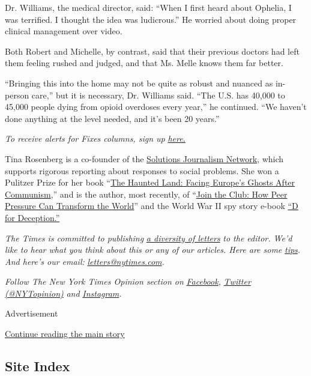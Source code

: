 Dr. Williams, the medical director, said: ``When I first heard about
Ophelia, I was terrified. I thought the idea was ludicrous.'' He worried
about doing proper clinical management over video.

Both Robert and Michelle, by contrast, said that their previous doctors
had left them feeling rushed and judged, and that Ms. Melle knows them
far better.

``Bringing this into the home may not be quite as robust and nuanced as
in-person care,'' but it is necessary, Dr. Williams said. ``The U.S. has
40,000 to 45,000 people dying from opioid overdoses every year,'' he
continued. ``We haven't done anything at the level needed, and it's been
20 years.''

\emph{To receive alerts for Fixes columns, sign up}
\href{http://eepurl.com/ABIxL}{\emph{here.}}

Tina Rosenberg is a co-founder of the
\href{http://solutionsjournalism.org}{Solutions Journalism Network},
which supports rigorous reporting about responses to social problems.
She won a Pulitzer Prize for her book
``\href{http://www.randomhouse.com/catalog/display.pperl?isbn=9780679744993}{The
Haunted Land: Facing Europe's Ghosts After Communism},'' and is the
author, most recently, of
``\href{http://books.wwnorton.com/books/Join-the-Club}{Join the Club:
How Peer Pressure Can Transform the World}'' and the World War II spy
story e-book
\href{https://www.goodreads.com/book/show/16124470-d-for-deception}{``D
for Deception.''}

\emph{The Times is committed to publishing}
\href{https://www.nytimes.com/2019/01/31/opinion/letters/letters-to-editor-new-york-times-women.html}{\emph{a
diversity of letters}} \emph{to the editor. We'd like to hear what you
think about this or any of our articles. Here are some}
\href{https://help.nytimes.com/hc/en-us/articles/115014925288-How-to-submit-a-letter-to-the-editor}{\emph{tips}}\emph{.
And here's our email:}
\href{mailto:letters@nytimes.com}{\emph{letters@nytimes.com}}\emph{.}

\emph{Follow The New York Times Opinion section on}
\href{https://www.facebook.com/nytopinion}{\emph{Facebook}}\emph{,}
\href{http://twitter.com/NYTOpinion}{\emph{Twitter (@NYTopinion)}}
\emph{and}
\href{https://www.instagram.com/nytopinion/}{\emph{Instagram}}\emph{.}

Advertisement

\protect\hyperlink{after-bottom}{Continue reading the main story}

\hypertarget{site-index}{%
\subsection{Site Index}\label{site-index}}

